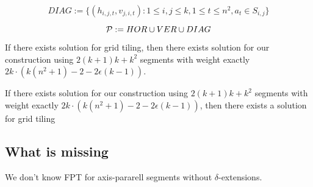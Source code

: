 $$DIAG := \{ (h_{i, j, t}, v_{j, i, t}) :
	1 \le i, j \le k, 1 \le t \le n^2, a_t \in S_{i, j}\}$$

$$\mathcal{P} := HOR \cup VER \cup DIAG$$

\begin{lemma}
	If there exists solution for grid tiling,
	then there exists solution for our construction
	using $2(k+1)k + k^2$ segments
	with weight exactly $2k \cdot (k(n^2+1) - 2 - 2\epsilon(k-1))$.
\end{lemma}

\begin{claim}
	
\end{claim}


\begin{lemma}
	If there exists solution for our construction
	using $2(k+1)k + k^2$ segments
	with weight exactly $2k \cdot (k(n^2+1) - 2 - 2\epsilon(k-1))$,
	then there exists a solution for grid tiling
\end{lemma}

	

\subsection{What is missing}
We don't know FPT for axis-pararell segments without $\delta$-extensions.
